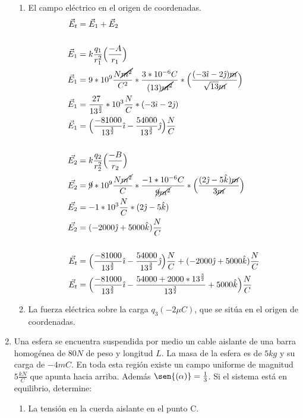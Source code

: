 \documentclass[12pt, twoside]{article}
\begin{document}
\begin{enumerate}
\begin{enumerate}
			\item El campo eléctrico en el origen de coordenadas.
				\begin{align*}
					\vec{E}_t &= \vec{E}_1 + \vec{E}_2\\
					\\
					\vec{E}_1 &= k \frac{q_1}{r_1^2}
					\Big{(}\frac{-A}{r_1}\Big{)}\\
					\vec{E}_1 &= 9*10^{9} \frac{N\cancel{\cancel{m^2}} }{C^2}*
					\frac{3*10^{-6}C}{(13)\cancel{\cancel{m^2} }}*
					\Big{(} \frac{(-3\hat{\imath}-2\hat{\jmath})\cancel{m}}{\sqrt{13}\cancel{m}} \Big{)}\\
					\vec{E}_1 &= \frac{27}{13^{ \frac{3}{2} }}*10^3\frac{N}{C}*
					(-3\hat{\imath}-2\hat{\jmath} )\\
					\vec{E}_1 &= \Big{(} \frac{-81000}{13^{ \frac{3}{2} }}\hat{\imath}-
					\frac{54000}{13^{ \frac{3}{2} }} \hat{\jmath}
					\Big{)} \frac{N}{C}\\
					\\
					\vec{E_2} &= k \frac{q_2}{r^2_2} \Big{(} \frac{-B}{r_2} \Big{)}\\
					\vec{E_2} &= \cancel{9}*10^9 \frac{N\cancel{m^2}}{C}*
					\frac{-1*10^{-6}C}{\cancel{9}\cancel{m^2}}*
					\Big{(} \frac{(2\hat{\jmath}-5\hat{k})\cancel{m}}{3\cancel{m}} \Big{)}\\
					\vec{E_2} &= -1*10^3 \frac{N}{C}*
					(2\hat{\jmath}-5\hat{k})\\
					\vec{E_2} &= (-2000 \hat{\jmath} + 5000 \hat{k}) \frac{N}{C}\\
					\\
					\vec{E_t} &=  \Big{(} \frac{-81000}{13^{ \frac{3}{2} }}\hat{\imath}-
					\frac{54000}{13^{ \frac{3}{2} }} \hat{\jmath}
					\Big{)} \frac{N}{C}+
					(-2000 \hat{\jmath} + 5000 \hat{k}) \frac{N}{C}\\
					\vec{E_t} &= \Big{(} \frac{-81000}{13^{ \frac{3}{2} }}\hat{\imath}-
					\frac{54000+2000*13^{ \frac{3}{2} }}{13^{ \frac{3}{2} }}
					+ 5000 \hat{k}
					\Big{)} \frac{N}{C}
				\end{align*}

			\item La fuerza eléctrica sobre la carga $q_3(-2\mu C)$,
				que se sitúa en el origen de coordenadas.
		\end{enumerate}

	\setcounter{enumi}{8}
	\item Una esfera se encuentra suspendida por medio un cable aislante
		de una barra homogénea de $80N$ de peso y longitud $L$.
		La masa de la esfera es de $5kg$ y su carga de $-4mC$.
		En toda esta región existe un campo uniforme de magnitud $5 \frac{kN}{C}$
		que apunta hacia arriba.
		Además $\sen{(\alpha)}=\frac{1}{3}$.
		Si el sistema está en equilibrio, determine:
		\begin{enumerate}
			\item La tensión en la cuerda aislante en el punto C.


\end{enumerate}
\end{enumerate}
\end{document}
